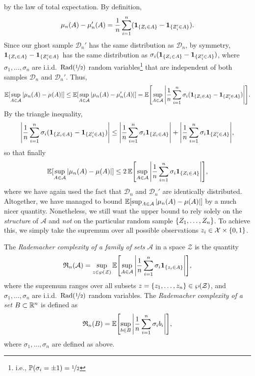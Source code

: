 by the law of total expectation. By definition,
\[
    \mu_n(A) - \mu_n'(A) = \frac{1}{n} \sum_{i=1}^n (\indSet{Z_i \in A} - \ind{\{Z_i' \in A\}}).
\]
Since our ghost sample $\mathcal{D}_n'$ has the same distribution as $\mathcal{D}_n$, by symmetry, $\indSet{Z_i \in A} - \ind{\{Z_i' \in A\}}$ has the same distribution as $\sigma_i (\indSet{Z_i \in A} - \ind{\{Z_i' \in A\}})$, where $\sigma_1, \dots, \sigma_n$ are i.i.d.\ $\operatorname{Rad}(\nicefrac{1}{2})$ random variables\footnote{i.e., $\operatorname{\mathbb{P}}(\sigma_i = \pm 1) = \nicefrac{1}{2}$} that are independent of both samples $\mathcal{D}_n$ and $\mathcal{D}_n'$. Thus,
\[
    \Exp[\sup_{A \in \mathcal{A}} \abs{\mu_n(A) - \mu(A)}] \leq \Exp[\sup_{A \in \mathcal{A}} \abs*{\mu_n(A) - \mu_n'(A)}] = \Exp\left[\sup_{A \in \mathcal{A}} \abs{\frac{1}{n} \sum_{i=1}^n \sigma_i (\indSet{Z_i \in A} - \ind{\{Z_i' \in A\}})}\right].
\]
By the triangle inequality,
\[
    \abs{\frac{1}{n} \sum_{i=1}^n \sigma_i (\indSet{Z_i \in A} - \ind{\{Z_i' \in A\}}) } \leq \abs{\frac{1}{n} \sum_{i=1}^n \sigma_i \indSet{Z_i \in A}} + \abs{\frac{1}{n} \sum_{i=1}^n \sigma_i \ind{\{Z_i' \in A\}}},
\]
so that finally
\begin{equation}
\label{eq: precursor to symmetrization bound}
    \Exp[\sup_{A \in \mathcal{A}} \abs{\mu_n(A) - \mu(A)}] \leq 2 \Exp\left[\sup_{A \in \mathcal{A}} \abs{\frac{1}{n} \sum_{i=1}^n \sigma_i \indSet{Z_i \in A}}\right],
\end{equation}
where we have again used the fact that $\mathcal{D}_n$ and $\mathcal{D}_n'$ are identically distributed. Altogether, we have managed to bound $\operatorname{\mathbb{E}}[\sup_{A \in \mathcal{A}} \abs{\mu_n(A) - \mu(A)}]$ by a much nicer quantity. Nonetheless, we still want the upper bound to rely solely on the \emph{structure} of $\mathcal{A}$ and \emph{not} on the particular random sample $\set{Z_1, \dots, Z_n}$. To achieve this, we simply take the supremum over all possible observations $z_i \in \mathcal{X} \times \set{0, 1}$.

\begin{definition}
The \emph{Rademacher complexity of a family of sets} $\mathcal{A}$ in a space $\mathcal{Z}$ is the quantity
\[
    \mathfrak{R}_n(\mathcal{A}) = \sup_{z \in \power(\mathcal{Z})} \Exp\left[\sup_{A \in \mathcal{A}} \abs{\frac{1}{n} \sum_{i=1}^n \sigma_i \indSet{z_i \in A}}\right],
\]
where the supremum ranges over all subsets $z = \set{z_1, \dots, z_n} \in \power(\mathcal{Z})$, and $\sigma_1, \dots, \sigma_n$ are i.i.d.\ $\operatorname{Rad}(\nicefrac{1}{2})$ random variables. The \emph{Rademacher complexity of a set} $B \subset \mathbb{R}^n$ is defined as 
\[
    \mathfrak{R}_n(B) = \Exp\left[\sup_{b \in B} \abs{\frac{1}{n} \sum_{i=1}^n \sigma_i b_i}\right],
\]
where $\sigma_1, \dots, \sigma_n$ are defined as above.
\end{definition}

